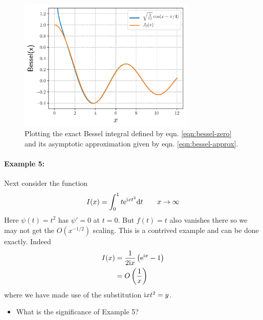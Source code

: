 \begin{figure}[!h]
	\centering
	\includegraphics[width=0.75\textwidth]{./plots/pdf/strogatz-wk05-bessel.pdf}
	\caption{Plotting the exact Bessel integral defined by eqn. \ref{eqn:bessel-zero} and its asymptotic approximation given by eqn. \ref{eqn:bessel-approx}.}
	\label{fig:strogatz-wk05-bessel}
\end{figure}

\paragraph{Example 5:} Next consider the function
\begin{gather*}
	I(x) = \int_{0}^{1} t \mathrm{e}^{\mathrm{i} x t^2} \mathrm{d} t \qquad x \rightarrow \infty
\end{gather*}
Here $\psi(t)=t^2$ has $\psi'=0$ at $t=0$. But $f(t)=t$ also vanishes there so we may not get the $O(x^{-1/2})$ scaling. This is a contrived example and can be done exactly. Indeed
\begin{align*}
	I(x) &= \frac{1}{2\mathrm{i} x} \left(\mathrm{e}^{\mathrm{i} x} - 1\right) \\
		&= O\left(\frac{1}{x}\right)
\end{align*} 
where we have made use of the substitution $\mathrm{i} x t^2 = y$. 

\begin{itemize}
	\item What is the significance of Example 5?
\end{itemize}


